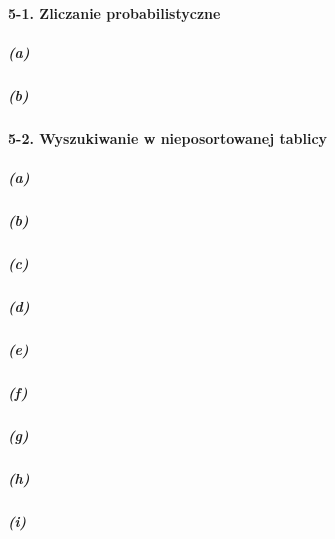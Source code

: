 \paragraph{5-1. Zliczanie probabilistyczne}

\subparagraph{(a)}
\subparagraph{(b)}

\paragraph{5-2. Wyszukiwanie w nieposortowanej tablicy}

\subparagraph{(a)}
\subparagraph{(b)}
\subparagraph{(c)}
\subparagraph{(d)}
\subparagraph{(e)}
\subparagraph{(f)}
\subparagraph{(g)}
\subparagraph{(h)}
\subparagraph{(i)}
